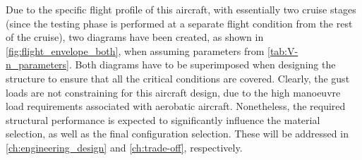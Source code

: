 Due to the specific flight profile of this aircraft, with essentially two cruise stages (since the testing phase is performed at a separate flight condition from the rest of the cruise), two diagrams have been created, as shown in \autoref{fig:flight_envelope_both}, when assuming parameters from \autoref{tab:V-n_parameters}. Both diagrams have to be superimposed when designing the structure  to ensure that all the critical conditions are covered. Clearly, the gust loads are not constraining for this aircraft design, due to the high manoeuvre load requirements associated with aerobatic aircraft. Nonetheless, the required structural performance is expected to significantly influence the material selection, as well as the final configuration selection. These will be addressed in \autoref{ch:engineering_design} and \autoref{ch:trade-off}, respectively.

